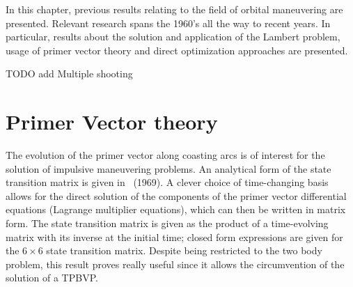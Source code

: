 
In this chapter, previous results relating to the field of orbital maneuvering are presented. Relevant research spans the 1960's all the way to recent years. In particular, results about the solution and application of the Lambert problem, usage of primer vector theory and direct optimization approaches are presented.

TODO add Multiple shooting




\section{Primer Vector theory}

The evolution of the primer vector along coasting arcs is of interest for the solution of impulsive maneuvering problems. An analytical form of the state transition matrix is given in~\citeauthor{glandorf_transition_matrix} (1969). A clever choice of time-changing basis allows for the direct solution of the components of the primer vector differential equations (Lagrange multiplier equations), which can then be written in matrix form. The state transition matrix is given as the product of a time-evolving matrix with its inverse at the initial time; closed form expressions are given for the \(6\times6\) state transition matrix. Despite being restricted to the two body problem, this result proves really useful since it allows the circumvention of the solution of a TPBVP.


